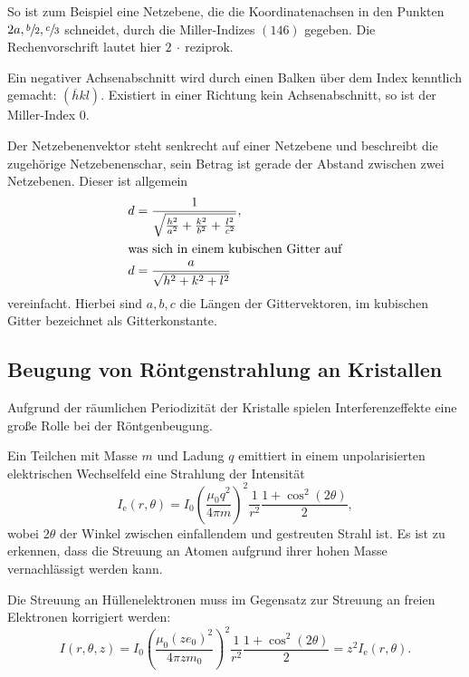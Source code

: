 So ist zum Beispiel eine Netzebene, die die Koordinatenachsen in den
Punkten $2a, \sfrac{b}{2}, \sfrac{c}{3}$ schneidet,
durch die Miller-Indizes $(146)$ gegeben.
Die Rechenvorschrift lautet hier $2~\cdot~\text{reziprok}$.

Ein negativer Achsenabschnitt wird durch einen Balken über dem Index
kenntlich gemacht: $\left(\overline{h}kl\right)$.
Existiert in einer Richtung kein Achsenabschnitt, so ist der Miller-Index 0.

Der Netzebenenvektor steht senkrecht auf einer Netzebene und beschreibt
die zugehörige Netzebenenschar, sein Betrag ist gerade der Abstand zwischen zwei Netzebenen.
Dieser ist allgemein
\begin{align}
  d &= \frac{1}{\sqrt{%
    \frac{h^2}{a^2} + \frac{k^2}{b^2} + \frac{l^2}{c^2}
  }}, \\
  \intertext{was sich in einem kubischen Gitter auf}
  \label{eq:netzebenensbstand}
  d &= \frac{a}{\sqrt{%
    h^2 + k^2 + l^2
  }}
\end{align}
vereinfacht.
Hierbei sind $a, b, c$ die Längen der Gittervektoren,
im kubischen Gitter bezeichnet als Gitterkonstante.

\subsection{Beugung von Röntgenstrahlung an Kristallen}
Aufgrund der räumlichen Periodizität der Kristalle spielen
Interferenzeffekte eine große Rolle bei der Röntgenbeugung.

Ein Teilchen mit Masse $m$ und Ladung $q$ emittiert in einem
unpolarisierten elektrischen Wechselfeld eine Strahlung der Intensität
\begin{equation}
  \label{eq:strahlung_elektron}
  I_\text{e} (r, \theta) = I_0 {\left(\frac{\mu_0 q^2}{4\pi m}\right)}^2 \frac{1}{r^2} \frac{1+ \cos^2\! (2\theta)}{2},
\end{equation}
wobei $2\theta$ der Winkel zwischen einfallendem und gestreuten Strahl ist.
Es ist zu erkennen, dass die Streuung an Atomen aufgrund ihrer hohen Masse
vernachlässigt werden kann.

Die Streuung an Hüllenelektronen muss im Gegensatz zur Streuung an freien
Elektronen korrigiert werden:
\begin{equation}
  \label{eq:strahlung_huellenelektron}
  I (r, \theta, z) = I_0 {\left(\frac{\mu_0 {\left(z e_0 \right)}^2}{4\pi z m_0}\right)}^2 \frac{1}{r^2} \frac{1+\cos^2\! (2\theta)}{2}
  = z^2 I_\text{e} (r, \theta).
\end{equation}

